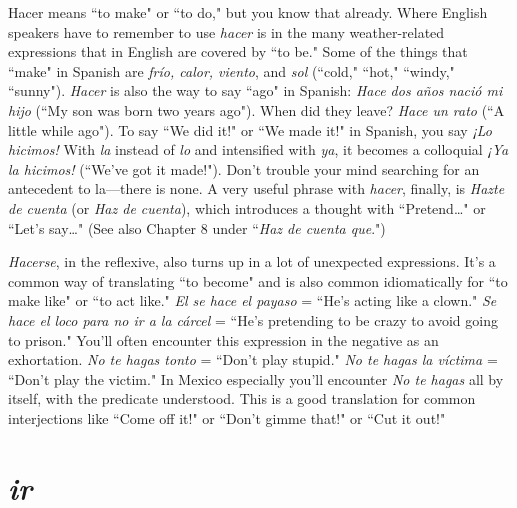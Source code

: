 Hacer means ``to make" or ``to do," but you know that already.
Where English speakers have to remember to use \emph{hacer} is in the many
weather-related expressions that in English are covered by ``to be."
Some of the things that ``make" in Spanish are \emph{frío, calor, viento}, and
\emph{sol} (``cold," ``hot," ``windy," ``sunny"). \emph{Hacer} is also the way to say
``ago" in Spanish: \emph{Hace dos años nació mi hijo} (``My son was born two
years ago"). When did they leave? \emph{Hace un rato} (``A little while ago").
To say ``We did it!" or ``We made it!" in Spanish, you say \emph{¡Lo hicimos!}
With \emph{la} instead of \emph{lo} and intensified with \emph{ya}, it becomes a colloquial
\emph{¡Ya la hicimos!} (``We've got it made!"). Don't trouble your mind
searching for an antecedent to la---there is none. A very useful phrase
with \emph{hacer}, finally, is \emph{Hazte de cuenta} (or \emph{Haz de cuenta}), which introduces a thought with ``Pretend\ldots{}" or ``Let's say\ldots{}" (See also
Chapter 8 under ``\emph{Haz de cuenta que}.")

\emph{Hacerse}, in the reflexive, also turns up in a lot of unexpected
expressions. It's a common way of translating ``to become" and is also
common idiomatically for ``to make like" or ``to act like." \emph{El se hace el
	payaso} = ``He's acting like a clown." \emph{Se hace el loco para no ir a la
	cárcel} = ``He's pretending to be crazy to avoid going to prison." You'll
often encounter this expression in the negative as an exhortation.
\emph{No te hagas tonto} = ``Don't play stupid." \emph{No te hagas la víctima} =
``Don't play the victim." In Mexico especially you'll encounter \emph{No te
	hagas} all by itself, with the predicate understood. This is a good translation for common interjections like ``Come off it!" or ``Don't gimme
that!" or ``Cut it out!"

\section{\emph{ir}}

